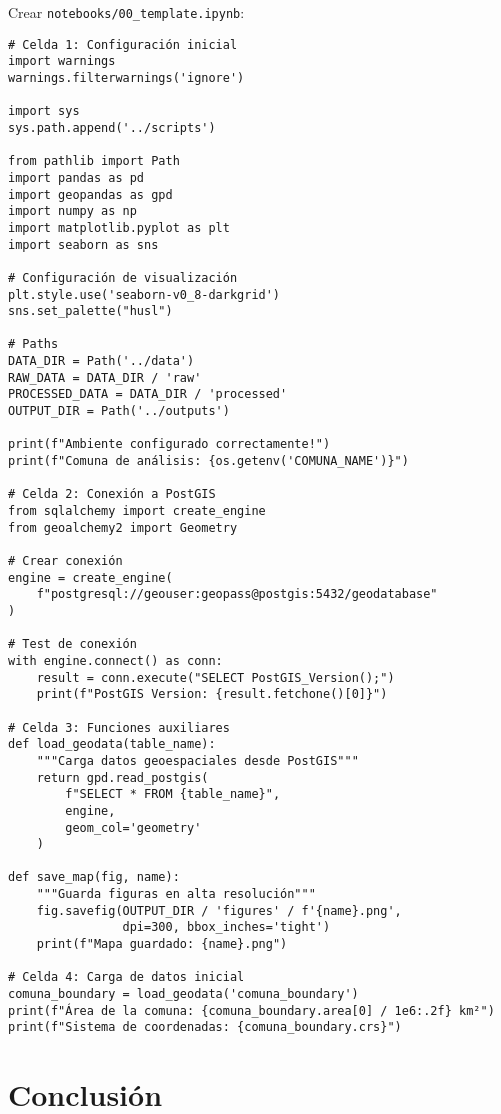 \documentclass[12pt,a4paper]{article}
\begin{document}
Crear \texttt{notebooks/00\_template.ipynb}:

\begin{verbatim}
# Celda 1: Configuración inicial
import warnings
warnings.filterwarnings('ignore')

import sys
sys.path.append('../scripts')

from pathlib import Path
import pandas as pd
import geopandas as gpd
import numpy as np
import matplotlib.pyplot as plt
import seaborn as sns

# Configuración de visualización
plt.style.use('seaborn-v0_8-darkgrid')
sns.set_palette("husl")

# Paths
DATA_DIR = Path('../data')
RAW_DATA = DATA_DIR / 'raw'
PROCESSED_DATA = DATA_DIR / 'processed'
OUTPUT_DIR = Path('../outputs')

print(f"Ambiente configurado correctamente!")
print(f"Comuna de análisis: {os.getenv('COMUNA_NAME')}")

# Celda 2: Conexión a PostGIS
from sqlalchemy import create_engine
from geoalchemy2 import Geometry

# Crear conexión
engine = create_engine(
    f"postgresql://geouser:geopass@postgis:5432/geodatabase"
)

# Test de conexión
with engine.connect() as conn:
    result = conn.execute("SELECT PostGIS_Version();")
    print(f"PostGIS Version: {result.fetchone()[0]}")

# Celda 3: Funciones auxiliares
def load_geodata(table_name):
    """Carga datos geoespaciales desde PostGIS"""
    return gpd.read_postgis(
        f"SELECT * FROM {table_name}",
        engine,
        geom_col='geometry'
    )

def save_map(fig, name):
    """Guarda figuras en alta resolución"""
    fig.savefig(OUTPUT_DIR / 'figures' / f'{name}.png',
                dpi=300, bbox_inches='tight')
    print(f"Mapa guardado: {name}.png")

# Celda 4: Carga de datos inicial
comuna_boundary = load_geodata('comuna_boundary')
print(f"Área de la comuna: {comuna_boundary.area[0] / 1e6:.2f} km²")
print(f"Sistema de coordenadas: {comuna_boundary.crs}")
\end{verbatim}

\section{Conclusión}
\end{document}
